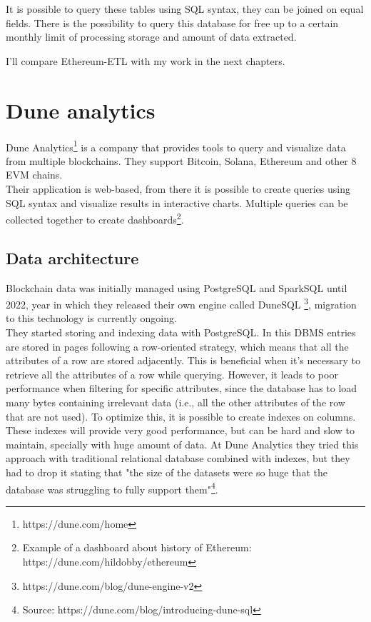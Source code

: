 It is possible to query these tables using SQL syntax, they can be joined on equal fields. There is the possibility to query this database for free up to a certain monthly limit of processing storage and amount of data extracted. 

I'll compare Ethereum-ETL with my work in the next chapters.

\section{Dune analytics}

Dune Analytics\footnote{https://dune.com/home} is a company that provides tools to query and visualize data from multiple blockchains. They support Bitcoin, Solana, Ethereum and other 8 EVM chains.\\

Their application is web-based, from there it is possible to create queries using SQL syntax and visualize results in interactive charts. Multiple queries can be collected together to create dashboards\footnote{Example of a dashboard about history of Ethereum: https://dune.com/hildobby/ethereum}.  

\subsection{Data architecture}

Blockchain data was initially managed using PostgreSQL and SparkSQL until 2022, year in which they released their own engine called DuneSQL \footnote{https://dune.com/blog/dune-engine-v2}, migration to this technology is currently ongoing. \\

They started storing and indexing data with PostgreSQL.
In this DBMS entries are stored in pages following a row-oriented strategy, which means that all the attributes of a row are stored adjacently. This is beneficial when it's necessary to retrieve all the attributes of a row while querying. However, it leads to poor performance when filtering for specific attributes, since the database has to load many bytes containing irrelevant data (i.e., all the other attributes of the row that are not used). To optimize this, it is possible to create indexes on columns. These indexes will provide very good performance, but can be hard and slow to maintain, specially with huge amount of data. At Dune Analytics they tried this approach with traditional relational database combined with indexes, but they had to drop it stating that "the size of the datasets were so huge that the database was struggling to fully support them"\footnote{Source: https://dune.com/blog/introducing-dune-sql}. \\

